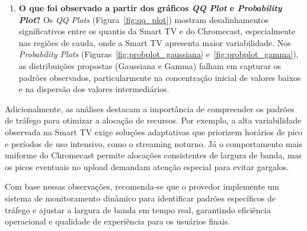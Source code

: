 \begin{enumerate}
    \item \textbf{O que foi observado a partir dos gráficos \textit{QQ Plot} e \textit{Probability Plot}?}  
    Os \textit{QQ Plots} (Figura~\ref{fig:qq_plot}) mostram desalinhamentos significativos entre os quantis da Smart TV e do Chromecast, especialmente nas regiões de cauda, onde a Smart TV apresenta maior variabilidade. Nos \textit{Probability Plots} (Figuras~\ref{fig:probplot_gaussiana} e~\ref{fig:probplot_gamma}), as distribuições propostas (Gaussiana e Gamma) falham em capturar os padrões observados, particularmente na concentração inicial de valores baixos e na dispersão dos valores intermediários.
\end{enumerate}

Adicionalmente, as análises destacam a importância de compreender os padrões de tráfego para otimizar a alocação de recursos. Por exemplo, a alta variabilidade observada na Smart TV exige soluções adaptativas que priorizem horários de pico e períodos de uso intensivo, como o streaming noturno. Já o comportamento mais uniforme do Chromecast permite alocações consistentes de largura de banda, mas os picos eventuais no upload demandam atenção especial para evitar gargalos.

Com base nessas observações, recomenda-se que o provedor implemente um sistema de monitoramento dinâmico para identificar padrões específicos de tráfego e ajustar a largura de banda em tempo real, garantindo eficiência operacional e qualidade de experiência para os usuários finais.

